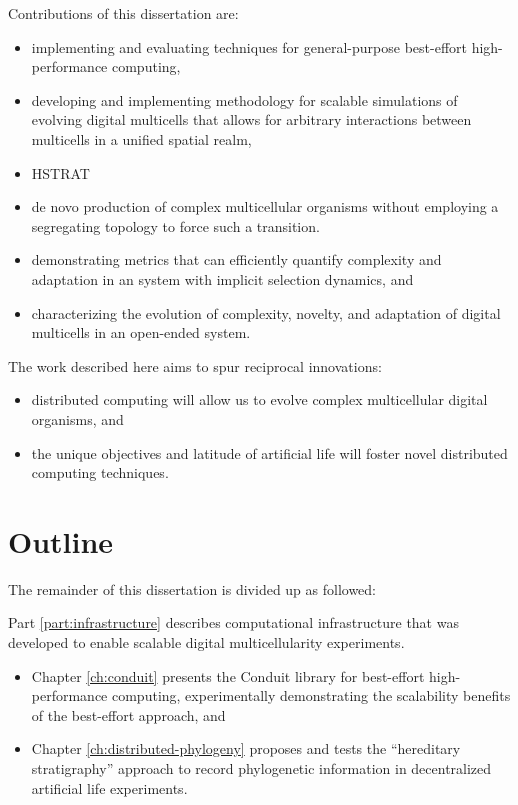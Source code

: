 Contributions of this dissertation are:
\begin{itemize}
\item implementing and evaluating techniques for general-purpose best-effort high-performance computing,
\item developing and implementing methodology for scalable simulations of evolving digital multicells that allows for arbitrary interactions between multicells in a unified spatial realm,
\item HSTRAT
\item de novo production of complex multicellular organisms without employing a segregating topology to force such a transition.
\item demonstrating metrics that can efficiently quantify complexity and adaptation in an system with implicit selection dynamics, and
\item characterizing the evolution of complexity, novelty, and adaptation of digital multicells in an open-ended system.
\end{itemize}

The work described here aims to spur reciprocal innovations:
\begin{itemize}
\item distributed computing will allow us to evolve complex multicellular digital organisms, and
\item the unique objectives and latitude of artificial life will foster novel distributed computing techniques.
\end{itemize}

\section{Outline}

The remainder of this dissertation is divided up as followed:

Part \ref{part:infrastructure} describes computational infrastructure that was developed to enable scalable digital multicellularity experiments.
\begin{itemize}
\item Chapter \ref{ch:conduit} presents the Conduit library for best-effort high-performance computing, experimentally demonstrating the scalability benefits of the best-effort approach, and
\item Chapter \ref{ch:distributed-phylogeny} proposes and tests the ``hereditary stratigraphy'' approach to record phylogenetic information in decentralized artificial life experiments.
\end{itemize}

